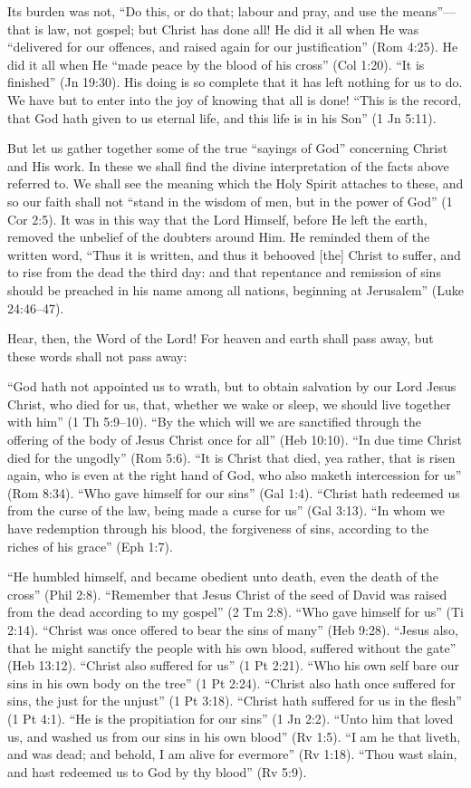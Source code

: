 \documentclass[
]{book}
\begin{document}
Its burden was not, ``Do this, or do that; labour and pray, and use the means''---that is law, not gospel; but Christ has done all! He did it all when He was ``delivered for our offences, and raised again for our justification'' (Rom 4:25). He did it all when He ``made peace by the blood of his cross'' (Col 1:20). ``It is finished'' (Jn 19:30). His doing is so complete that it has left nothing for us to do. We have but to enter into the joy of knowing that all is done! ``This is the record, that God hath given to us eternal life, and this life is in his Son'' (1 Jn 5:11).

But let us gather together some of the true ``sayings of God'' concerning Christ and His work. In these we shall find the divine interpretation of the facts above referred to. We shall see the meaning which the Holy Spirit attaches to these, and so our faith shall not ``stand in the wisdom of men, but in the power of God'' (1 Cor 2:5). It was in this way that the Lord Himself, before He left the earth, removed the unbelief of the doubters around Him. He reminded them of the written word, ``Thus it is written, and thus it behooved {[}the{]} Christ to suffer, and to rise from the dead the third day: and that repentance and remission of sins should be preached in his name among all nations, beginning at Jerusalem'' (Luke 24:46--47).

Hear, then, the Word of the Lord! For heaven and earth shall pass away, but these words shall not pass away:

``God hath not appointed us to wrath, but to obtain salvation by our Lord Jesus Christ, who died for us, that, whether we wake or sleep, we should live together with him'' (1 Th 5:9--10). ``By the which will we are sanctified through the offering of the body of Jesus Christ once for all'' (Heb 10:10). ``In due time Christ died for the ungodly'' (Rom 5:6). ``It is Christ that died, yea rather, that is risen again, who is even at the right hand of God, who also maketh intercession for us'' (Rom 8:34). ``Who gave himself for our sins'' (Gal 1:4). ``Christ hath redeemed us from the curse of the law, being made a curse for us'' (Gal 3:13). ``In whom we have redemption through his blood, the forgiveness of sins, according to the riches of his grace'' (Eph 1:7).

``He humbled himself, and became obedient unto death, even the death of the cross'' (Phil 2:8). ``Remember that Jesus Christ of the seed of David was raised from the dead according to my gospel'' (2 Tm 2:8). ``Who gave himself for us'' (Ti 2:14). ``Christ was once offered to bear the sins of many'' (Heb 9:28). ``Jesus also, that he might sanctify the people with his own blood, suffered without the gate'' (Heb 13:12). ``Christ also suffered for us'' (1 Pt 2:21). ``Who his own self bare our sins in his own body on the tree'' (1 Pt 2:24). ``Christ also hath once suffered for sins, the just for the unjust'' (1 Pt 3:18). ``Christ hath suffered for us in the flesh'' (1 Pt 4:1). ``He is the propitiation for our sins'' (1 Jn 2:2). ``Unto him that loved us, and washed us from our sins in his own blood'' (Rv 1:5). ``I am he that liveth, and was dead; and behold, I am alive for evermore'' (Rv 1:18). ``Thou wast slain, and hast redeemed us to God by thy blood'' (Rv 5:9).
\end{document}
